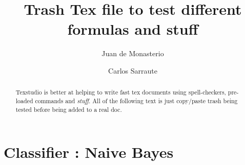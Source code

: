 \documentclass{article}%
\newcommand{\Expect}{{\mathbb{E}}}
\newtheorem{definition}{Definition}[subsection]
\theoremstyle{definition}
\begin{document}

\title{Trash Tex file to test different formulas and stuff}




\author{
	Juan de Monasterio
	\and Carlos Sarraute
}

%
%


\maketitle
\begin{abstract}
	
	Texstudio is better at helping to write fast tex documents using spell-checkers, pre-loaded commands and \textit{stuff}. All of the following text is just copy/paste trash being tested before being added to a real doc.
	



	
	
\end{abstract} 

\section{Classifier : Naive Bayes}
\end{document}
